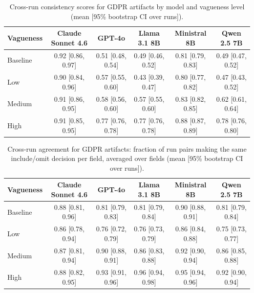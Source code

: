 \begin{table}[t]
  \centering
  \caption{Cross-run consistency scores for GDPR artifacts by model and vagueness level (mean [95\% bootstrap CI over runs]).}
  \label{tab:gdpr_consistency}
  \begin{tabular}{lccccc}
    \toprule
    Vagueness & Claude Sonnet 4.6 & GPT-4o & Llama 3.1 8B & Ministral 8B & Qwen 2.5 7B \\
    \midrule
    Baseline & 0.92 {\scriptsize [0.86, 0.97]} & 0.51 {\scriptsize [0.48, 0.54]} & 0.49 {\scriptsize [0.46, 0.52]} & 0.81 {\scriptsize [0.79, 0.83]} & 0.49 {\scriptsize [0.47, 0.52]} \\
    Low & 0.90 {\scriptsize [0.84, 0.96]} & 0.57 {\scriptsize [0.55, 0.60]} & 0.43 {\scriptsize [0.39, 0.47]} & 0.80 {\scriptsize [0.77, 0.82]} & 0.47 {\scriptsize [0.43, 0.52]} \\
    Medium & 0.91 {\scriptsize [0.86, 0.95]} & 0.58 {\scriptsize [0.56, 0.60]} & 0.57 {\scriptsize [0.55, 0.60]} & 0.83 {\scriptsize [0.82, 0.85]} & 0.62 {\scriptsize [0.61, 0.64]} \\
    High & 0.91 {\scriptsize [0.85, 0.95]} & 0.77 {\scriptsize [0.76, 0.78]} & 0.77 {\scriptsize [0.76, 0.78]} & 0.88 {\scriptsize [0.87, 0.89]} & 0.78 {\scriptsize [0.76, 0.80]} \\
    \bottomrule
  \end{tabular}
\end{table}

\begin{table}[t]
  \centering
  \caption{Cross-run agreement for GDPR artifacts: fraction of run pairs making the same include/omit decision per field, averaged over fields (mean [95\% bootstrap CI over runs]).}
  \label{tab:gdpr_agreement}
  \begin{tabular}{lccccc}
    \toprule
    Vagueness & Claude Sonnet 4.6 & GPT-4o & Llama 3.1 8B & Ministral 8B & Qwen 2.5 7B \\
    \midrule
    Baseline & 0.88 {\scriptsize [0.81, 0.96]} & 0.81 {\scriptsize [0.79, 0.83]} & 0.81 {\scriptsize [0.79, 0.84]} & 0.90 {\scriptsize [0.88, 0.91]} & 0.81 {\scriptsize [0.79, 0.84]} \\
    Low & 0.86 {\scriptsize [0.78, 0.94]} & 0.76 {\scriptsize [0.72, 0.79]} & 0.76 {\scriptsize [0.73, 0.79]} & 0.86 {\scriptsize [0.84, 0.88]} & 0.75 {\scriptsize [0.73, 0.77]} \\
    Medium & 0.87 {\scriptsize [0.81, 0.94]} & 0.90 {\scriptsize [0.88, 0.91]} & 0.86 {\scriptsize [0.83, 0.88]} & 0.92 {\scriptsize [0.90, 0.94]} & 0.86 {\scriptsize [0.85, 0.88]} \\
    High & 0.88 {\scriptsize [0.82, 0.95]} & 0.93 {\scriptsize [0.91, 0.96]} & 0.96 {\scriptsize [0.94, 0.98]} & 0.95 {\scriptsize [0.94, 0.96]} & 0.92 {\scriptsize [0.90, 0.94]} \\
    \bottomrule
  \end{tabular}
\end{table}

